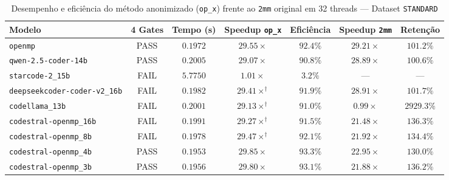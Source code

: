 \begin{table}[htbp]
\centering
\caption{Desempenho e eficiência do método anonimizado (\texttt{op\_x}) frente ao \texttt{2mm} original em 32 threads — Dataset \texttt{STANDARD}}
\label{tab:anon_scale_standard_32t}
\small
\begin{tabular}{lcccccc}
\toprule
\textbf{Modelo} & \textbf{4 Gates} & \textbf{Tempo (s)} & \textbf{Speedup \texttt{op\_x}} & \textbf{Eficiência} & \textbf{Speedup \texttt{2mm}} & \textbf{Retenção} \\
\midrule
\texttt{openmp} & PASS & $0.1972$ & $29.55\times$ & $92.4\%$ & $29.21\times$ & $101.2\%$ \\
\texttt{qwen-2.5-coder-14b} & PASS & $0.2005$ & $29.07\times$ & $90.8\%$ & $28.89\times$ & $100.6\%$ \\
\texttt{starcode-2\_15b} & FAIL & $5.7750$ & $1.01\times$ & $3.2\%$ & --- & --- \\
\texttt{deepseekcoder-coder-v2\_16b} & FAIL & $0.1982$ & $29.41\times^\dagger$ & $91.9\%$ & $28.91\times$ & $101.7\%$ \\
\texttt{codellama\_13b} & FAIL & $0.2001$ & $29.13\times^\dagger$ & $91.0\%$ & $0.99\times$ & $2929.3\%$ \\
\texttt{codestral-openmp\_16b} & FAIL & $0.1991$ & $29.27\times^\dagger$ & $91.5\%$ & $21.48\times$ & $136.3\%$ \\
\texttt{codestral-openmp\_8b} & FAIL & $0.1978$ & $29.47\times^\dagger$ & $92.1\%$ & $21.92\times$ & $134.4\%$ \\
\texttt{codestral-openmp\_4b} & PASS & $0.1953$ & $29.85\times$ & $93.3\%$ & $22.95\times$ & $130.0\%$ \\
\texttt{codestral-openmp\_3b} & PASS & $0.1956$ & $29.80\times$ & $93.1\%$ & $21.88\times$ & $136.2\%$ \\
\bottomrule
\end{tabular}
\end{table}

